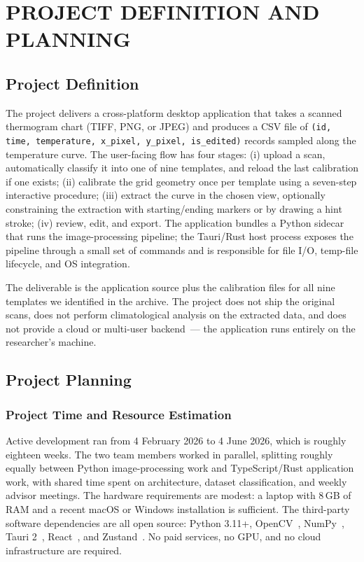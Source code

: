 \documentclass[a4paper,12pt]{report}
\begin{document}
\chapter{PROJECT DEFINITION AND PLANNING}
\section{Project Definition}

The project delivers a cross-platform desktop application that takes a scanned thermogram chart (TIFF, PNG, or JPEG) and produces a CSV file of \texttt{(id, time, temperature, x\_pixel, y\_pixel, is\_edited)} records sampled along the temperature curve. The user-facing flow has four stages: (i) upload a scan, automatically classify it into one of nine templates, and reload the last calibration if one exists; (ii) calibrate the grid geometry once per template using a seven-step interactive procedure; (iii) extract the curve in the chosen view, optionally constraining the extraction with starting/ending markers or by drawing a hint stroke; (iv) review, edit, and export. The application bundles a Python sidecar that runs the image-processing pipeline; the Tauri/Rust host process exposes the pipeline through a small set of commands and is responsible for file I/O, temp-file lifecycle, and OS integration.

The deliverable is the application source plus the calibration files for all nine templates we identified in the archive. The project does not ship the original scans, does not perform climatological analysis on the extracted data, and does not provide a cloud or multi-user backend~--- the application runs entirely on the researcher's machine.

\section{Project Planning}
\subsection{Project Time and Resource Estimation}

Active development ran from 4 February 2026 to 4 June 2026, which is roughly eighteen weeks. The two team members worked in parallel, splitting roughly equally between Python image-processing work and TypeScript/Rust application work, with shared time spent on architecture, dataset classification, and weekly advisor meetings. The hardware requirements are modest: a laptop with 8\,GB of RAM and a recent macOS or Windows installation is sufficient. The third-party software dependencies are all open source: Python 3.11+, OpenCV~\cite{bradski2000opencv}, NumPy~\cite{harris2020numpy}, Tauri 2~\cite{tauri}, React~\cite{react}, and Zustand~\cite{zustand}. No paid services, no GPU, and no cloud infrastructure are required.
\end{document}
